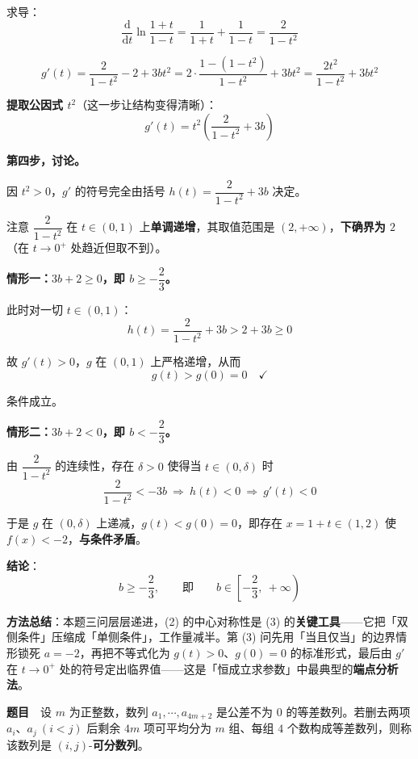 求导：
\[\frac{\mathrm d}{\mathrm dt}\ln\frac{1+t}{1-t}=\frac1{1+t}+\frac1{1-t}=\frac2{1-t^{2}}\]

\[g'(t)=\frac2{1-t^{2}}-2+3bt^{2}=2\cdot\frac{1-\left(1-t^{2}\right)}{1-t^{2}}+3bt^{2}=\frac{2t^{2}}{1-t^{2}}+3bt^{2}\]

\textbf{提取公因式 $t^{2}$}（这一步让结构变得清晰）：
\[\boxed{g'(t)=t^{2}\left(\frac2{1-t^{2}}+3b\right)}\]

\textbf{第四步，讨论。}

因 $t^{2}>0$，$g'$ 的符号完全由括号 $h(t)=\dfrac2{1-t^{2}}+3b$ 决定。

注意 $\dfrac2{1-t^{2}}$ 在 $t\in(0,1)$ 上\textbf{单调递增}，其取值范围是 $(2,+\infty)$，\textbf{下确界为 $2$}（在 $t\to0^{+}$ 处趋近但取不到）。

\textbf{情形一：$3b+2\ge0$，即 $b\ge-\dfrac23$。}

此时对一切 $t\in(0,1)$：
\[h(t)=\frac2{1-t^{2}}+3b>2+3b\ge0\]

故 $g'(t)>0$，$g$ 在 $(0,1)$ 上严格递增，从而
\[g(t)>g(0)=0\quad\checkmark\]

条件成立。

\textbf{情形二：$3b+2<0$，即 $b<-\dfrac23$。}

由 $\dfrac2{1-t^{2}}$ 的连续性，存在 $\delta>0$ 使得当 $t\in(0,\delta)$ 时
\[\frac2{1-t^{2}}<-3b\ \Longrightarrow\ h(t)<0\ \Longrightarrow\ g'(t)<0\]

于是 $g$ 在 $(0,\delta)$ 上递减，$g(t)<g(0)=0$，即存在 $x=1+t\in(1,2)$ 使 $f(x)<-2$，\textbf{与条件矛盾}。

\textbf{结论}：
\[b\ge-\frac23,\qquad\text{即}\qquad b\in\left[-\frac23,\ +\infty\right)\]

\begin{gktip}
\textbf{方法总结}：本题三问层层递进，(2) 的中心对称性是 (3) 的\textbf{关键工具}——它把「双侧条件」压缩成「单侧条件」，工作量减半。第 (3) 问先用「当且仅当」的边界情形锁死 $a=-2$，再把不等式化为 $g(t)>0$、$g(0)=0$ 的标准形式，最后由 $g'$ 在 $t\to0^{+}$ 处的符号定出临界值——这是「恒成立求参数」中最典型的\textbf{端点分析法}。
\end{gktip}

\par\medskip


\textbf{题目}　设 $m$ 为正整数，数列 $a_1,\cdots,a_{4m+2}$ 是公差不为 $0$ 的等差数列。若删去两项 $a_i$、$a_j\ (i<j)$ 后剩余 $4m$ 项可平均分为 $m$ 组、每组 $4$ 个数构成等差数列，则称该数列是 $(i,j)$-\textbf{可分数列}。


